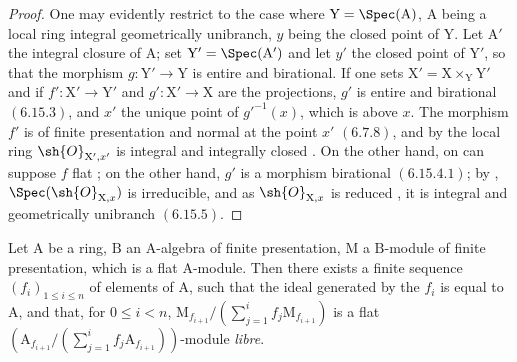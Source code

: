 \begin{proof}
One may evidently restrict to the case where $\mathrm{Y}=\Spec(\mathrm{A})$, $\mathrm{A}$ being a local ring integral geometrically unibranch, $y$ being the closed point of $\mathrm{Y}$. Let $\mathrm{A}'$ the integral closure of $\mathrm{A}$; set $\mathrm{Y}'=\Spec(\mathrm{A}')$ and let $y'$ the closed point of $\mathrm{Y}'$, so that the morphism $g:\mathrm{Y}'\to\mathrm{Y}$ is entire and birational. If one sets $\mathrm{X}'=\mathrm{X}\times_\mathrm{Y}\mathrm{Y}'$ and if $f':\mathrm{X}'\to\mathrm{Y}'$ and $g':\mathrm{X}'\to\mathrm{X}$ are the projections, $g'$ is entire and birational $(6.15.3)$, and $x'$ the unique point of $g'^{-1}(x)$, which is above $x$. The morphism $f'$ is of finite presentation and normal at the point $x'$ $(6.7.8)$, and by the local ring $\sh{O}_{\mathrm{X}',x'}$ is integral and integrally closed . On the other hand, on can suppose $f$ flat ; on the other hand, $g'$ is a morphism birational $(6.15.4.1)$; by , $\Spec(\sh{O}_{\mathrm{X},x})$ is irreducible, and as $\sh{O}_{\mathrm{X},x}$ is reduced , it is integral and geometrically unibranch $(6.15.5)$.
\end{proof}

\begin{proposition}[11.3.15]
\label{IV.11.3.15}
Let $\mathrm{A}$ be a ring, $\mathrm{B}$ an $\mathrm{A}$-algebra of finite presentation, $\mathrm{M}$ a $\mathrm{B}$-module of finite presentation, which is a flat $\mathrm{A}$-module. Then there exists a finite sequence $(f_i)_{1\leqslant i\leqslant n}$ of elements of $\mathrm{A}$, such that the ideal generated by the $f_i$ is equal to $\mathrm{A}$, and that, for $0\leqslant i<n$, $\mathrm{M}_{f_{i+1}}/(\sum_{j=1}^{i}f_j\mathrm{M}_{f_{i+1}})$ is a flat $(\mathrm{A}_{f_{i+1}}/(\sum_{j=1}^{i}f_j\mathrm{A}_{f_{i+1}}))$-module \emph{libre}.
\end{proposition}

